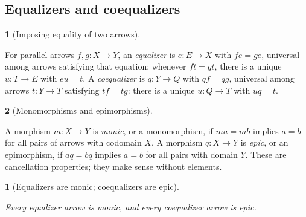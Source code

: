 \documentclass[11pt,a4paper]{article}
\newcommand{\mathheading}{}
\theoremstyle{plain}
\newtheorem*{plainstatement}{\mathheading}
\theoremstyle{definition}
\newtheorem*{definitionstatement}{\mathheading}
\newenvironment{mathstatement}[3]{\renewcommand{\mathheading}{#1 #2}\begin{plainstatement}[#3]}{\end{plainstatement}}
\newenvironment{mathdefinition}[3]{\renewcommand{\mathheading}{#1 #2}\begin{definitionstatement}[#3]}{\end{definitionstatement}}
\begin{document}
\subsection{Equalizers and coequalizers}

\begin{mathdefinition}{Definition}{2.5}{Imposing equality of two arrows}
\label{env-2-5}

For parallel arrows \(f,g:X\to Y\), an \emph{equalizer} is \(e:E\to X\) with \(fe=ge\), universal among arrows satisfying that equation: whenever \(ft=gt\), there is a unique \(u:T\to E\) with \(eu=t\). A \emph{coequalizer} is \(q:Y\to Q\) with \(qf=qg\), universal among arrows \(t:Y\to T\) satisfying \(tf=tg\): there is a unique \(u:Q\to T\) with \(uq=t\).


\par{}\par

\end{mathdefinition}
 
\begin{mathdefinition}{Definition}{2.6}{Monomorphisms and epimorphisms}
\label{env-2-6}

A morphism \(m:X\to Y\) is \emph{monic}, or a monomorphism, if \(ma=mb\) implies \(a=b\) for all pairs of arrows with codomain \(X\). A morphism \(q:X\to Y\) is \emph{epic}, or an epimorphism, if \(aq=bq\) implies \(a=b\) for all pairs with domain \(Y\). These are cancellation properties; they make sense without elements.


\par{}\par

\end{mathdefinition}
 
\begin{mathstatement}{Proposition}{2.7}{Equalizers are monic; coequalizers are epic}
\label{env-2-7}

Every equalizer arrow is monic, and every coequalizer arrow is epic.


\par{}\par

\end{mathstatement}
 
\end{document}
